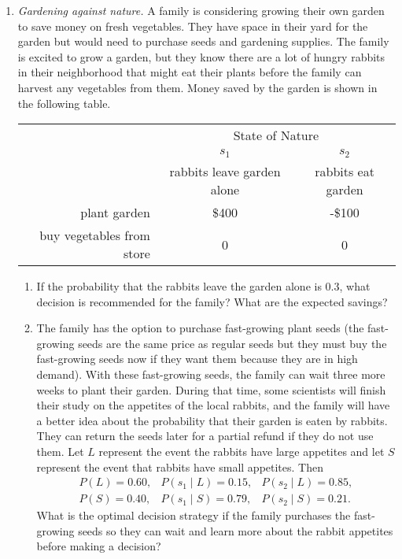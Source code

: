 \begin{enumerate}
\item \emph{Gardening against nature.} A family is considering growing
  their own garden to save money on fresh vegetables. They have space
  in their yard for the garden but would need to purchase seeds and
  gardening supplies. The family is excited to grow a garden, but they
  know there are a lot of hungry rabbits in their neighborhood that
  might eat their plants before the family can harvest any vegetables
  from them. Money saved by the garden is shown in the following
  table.

\begin{tabular}{rcc}
& \multicolumn{2}{c}{State of Nature} \\
& $s_1$ & $s_2$ \\
& rabbits leave garden alone & rabbits eat garden \\ \cline{2-3}
plant garden & \$400 & -\$100\\
buy vegetables from store & 0 & 0
\end{tabular}

\begin{enumerate}
    \item If the probability that the rabbits leave the garden alone is 0.3, what decision is recommended for the family? What are the expected savings?
    
    \item The family has the option to purchase fast-growing plant seeds (the fast-growing seeds are the same price as regular seeds but they must buy the fast-growing seeds now if they want them because they are in high demand).  With these fast-growing seeds, the family can wait three more weeks to plant their garden. During that time, some scientists will finish their study on the appetites of the local rabbits, and the family will have a better idea about the probability that their garden is eaten by rabbits. They can return the seeds later for a partial refund if they do not use them.
    Let $L$ represent the event the rabbits have large appetites and let $S$ represent
    the event that rabbits have small appetites. Then
    \[
    \begin{matrix}
    P(L)=0.60, & P(s_1 \mid L)=0.15, & P(s_2 \mid L)=0.85,\\
    P(S)=0.40, & P(s_1 \mid S)=0.79, & P(s_2 \mid S)=0.21.
    \end{matrix}
    \]
    What is the optimal decision strategy if the family purchases the fast-growing seeds so they can wait and learn more about the rabbit appetites before making a decision?
    

\end{enumerate}
\end{enumerate}

